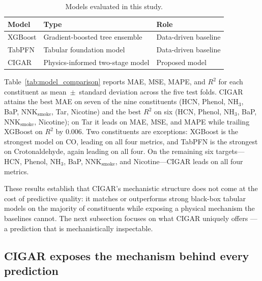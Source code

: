 ﻿\documentclass[a4paper,fleqn]{cas-sc}
\begin{document}
\begin{table}[pos=h]
    \centering
    \caption{Models evaluated in this study.}
    \label{tab:model_experiments}
    \begin{tabular}{lll}
        \toprule
        Model & Type & Role \\
        \midrule
        XGBoost & Gradient-boosted tree ensemble & Data-driven baseline \\
        TabPFN  & Tabular foundation model & Data-driven baseline \\
        CIGAR   & Physics-informed two-stage model & Proposed model \\
        \bottomrule
    \end{tabular}
\end{table}

Table~\ref{tab:model_comparison} reports MAE, MSE, MAPE, and $R^2$ for
each constituent as mean~$\pm$~standard deviation across the five test
folds. CIGAR attains the best MAE on seven of the nine constituents (HCN,
Phenol, NH$_3$, BaP, $\mathrm{NNK}_{\mathrm{smoke}}$, Tar, Nicotine) and the best $R^2$ on six (HCN,
Phenol, NH$_3$, BaP, $\mathrm{NNK}_{\mathrm{smoke}}$, Nicotine); on Tar it leads on MAE, MSE, and
MAPE while trailing XGBoost on $R^2$ by 0.006. Two constituents are
exceptions: XGBoost is the strongest model on CO, leading on all four
metrics, and TabPFN is the strongest on Crotonaldehyde, again leading on
all four. On the remaining six targets---HCN, Phenol, NH$_3$, BaP,
$\mathrm{NNK}_{\mathrm{smoke}}$, and Nicotine---CIGAR leads on all four metrics.



These results establish that CIGAR's mechanistic structure does not come
at the cost of predictive quality: it matches or outperforms strong
black-box tabular models on the majority of constituents while exposing a
physical mechanism the baselines cannot. The next subsection focuses on
what CIGAR uniquely offers --- a prediction that is mechanistically
inspectable.

\subsection{CIGAR exposes the mechanism behind every prediction}
\end{document}
